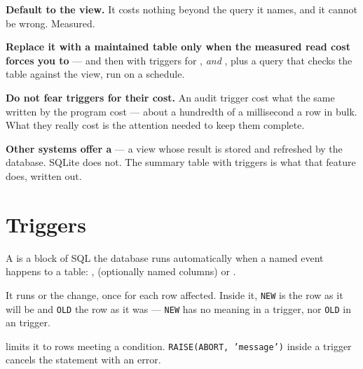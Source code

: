 \begin{alertbox}
\begin{tight}
  \item \textbf{Default to the view.} It costs nothing beyond the query it
        names, and it cannot be wrong. Measured.
  \item \textbf{Replace it with a maintained table only when the measured read
        cost forces you to} --- and then with triggers for ,
         \emph{and} , plus a query that checks the
        table against the view, run on a schedule.
  \item \textbf{Do not fear triggers for their cost.} An audit trigger cost
        what the same  written by the program cost --- about a
        hundredth of a millisecond a row in bulk. What they really cost is the
        attention needed to keep them complete.
  \item \textbf{Other systems offer a } --- a view
        whose result is stored and refreshed by the database. SQLite does not.
        The summary table with triggers is what that feature does, written out.
\end{tight}
\end{alertbox}

\section{Triggers}

\begin{definitionbox}[Trigger]
A  is a block of SQL the database runs automatically when a
named event happens to a table: ,  (optionally
 named columns) or .

\smallskip
It runs  or  the change, once for each row
affected. Inside it, \texttt{NEW} is the row as it will be and \texttt{OLD} the
row as it was --- \texttt{NEW} has no meaning in a  trigger, nor
\texttt{OLD} in an  trigger.

\smallskip
{} limits it to rows meeting a condition. \texttt{RAISE(ABORT,
'message')} inside a trigger cancels the statement with an error.
\end{definitionbox}

